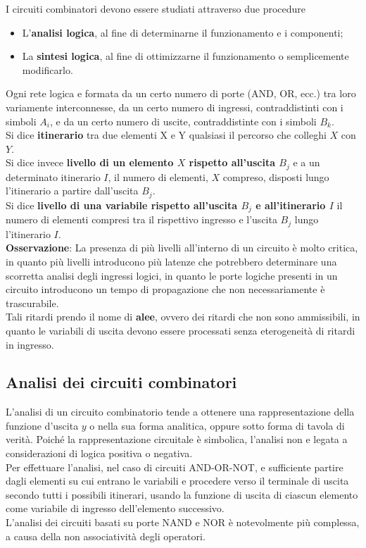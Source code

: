 \documentclass[a4paper]{extarticle}
\begin{document}
\vspace{1em}
\noindent
I circuiti combinatori devono essere studiati attraverso due procedure
\begin{itemize}
    \item L'\textbf{analisi logica}, al fine di determinarne il funzionamento e i componenti;
    \item La \textbf{sintesi logica}, al fine di ottimizzarne il funzionamento o semplicemente modificarlo.
\end{itemize}

\vspace{1em}
\noindent
Ogni rete logica e formata da un certo numero di porte (AND, OR, ecc.) tra loro variamente interconnesse, da un certo numero di ingressi, contraddistinti con i simboli \(A_i\), e da un certo numero di uscite, contraddistinte con i simboli \(B_k\).\\
Si dice \textbf{itinerario} tra due elementi X e Y qualsiasi il percorso che colleghi \(X\) con \(Y\).\\
Si dice invece \textbf{livello di un elemento \(X\) rispetto all’uscita \(B_j\)} e a un determinato
itinerario \(I\), il numero di elementi, \(X\) compreso, disposti lungo l’itinerario a partire dall’uscita \(B_j\).\\
Si dice \textbf{livello di una variabile rispetto all’uscita \(B_j\) e all’itinerario \(I\)} il numero di elementi compresi tra il rispettivo ingresso e l’uscita \(B_j\) lungo l’itinerario \(I\).\\

\vspace{1em}
\noindent
\textbf{Osservazione}: La presenza di più livelli all'interno di un circuito è molto critica, in quanto più livelli introducono più latenze che potrebbero determinare una scorretta analisi degli ingressi logici, in quanto le porte logiche presenti in un circuito introducono un tempo di propagazione che non necessariamente è trascurabile.\\
Tali ritardi prendo il nome di \textbf{alee}, ovvero dei ritardi che non sono ammissibili, in quanto le variabili di uscita devono essere processati senza eterogeneità di ritardi in ingresso.

\subsection{Analisi dei circuiti combinatori}
L’analisi di un circuito combinatorio tende a ottenere una rappresentazione della funzione d’uscita \(y\) o nella sua forma analitica, oppure sotto forma di tavola di verità. Poiché la rappresentazione circuitale è simbolica, l’analisi non e legata a considerazioni di logica positiva o negativa.\\
Per effettuare l’analisi, nel caso di circuiti AND-OR-NOT, e sufficiente partire dagli elementi su cui entrano le variabili e procedere verso il terminale di uscita secondo tutti i possibili itinerari, usando la funzione di uscita di ciascun elemento come variabile di ingresso dell’elemento successivo.\\
L’analisi dei circuiti basati su porte NAND e NOR è notevolmente più complessa, a causa della non associatività degli operatori.
\end{document}
